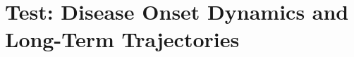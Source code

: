 \documentclass{article}
\begin{document}
\section*{Test: Disease Onset Dynamics and Long-Term Trajectories}


\end{document}
